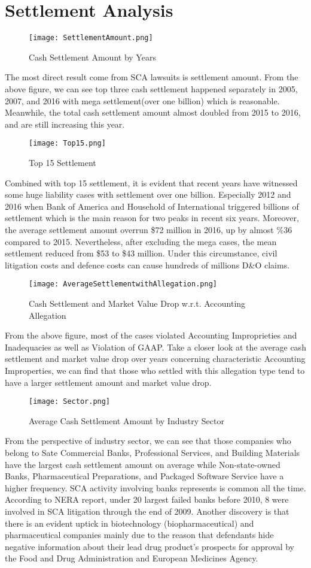 \section{Settlement Analysis}
\begin{figure}[H]
  \centering
  \texttt{[image: SettlementAmount.png]}
  \caption{Cash Settlement Amount by Years}
\end{figure}
The most direct result come from SCA lawsuits is settlement amount. From the above figure, we can see top three cash settlement happened separately in 2005, 2007, and 2016 with mega settlement(over one billion) which is reasonable. Meanwhile, the total cash settlement amount almost doubled from 2015 to 2016, and are still increasing this year. 
\begin{figure}[H]
  \centering
  \texttt{[image: Top15.png]}
  \caption{Top 15 Settlement}
\end{figure}
Combined with top 15 settlement, it is evident that recent years have witnessed some huge liability cases with settlement over one billion. Especially 2012 and 2016 when Bank of America and Household of International triggered billions of settlement which is the main reason for two peaks in recent six years. Moreover, the average settlement amount overrun \$72 million in 2016, up by almost \%36 compared to 2015. Nevertheless, after excluding the mega cases, the mean settlement reduced from \$53 to \$43 million. Under this circumstance, civil litigation costs and defence costs can cause hundreds of millions D\&O claims. 
\begin{figure}[H]
  \centering
  \texttt{[image: AverageSettlementwithAllegation.png]}
  \caption{Cash Settlement and Market Value Drop w.r.t. Accounting Allegation}
\end{figure}
From the above figure, most of the cases violated Accounting Improprieties and Inadequacies as well as Violation of GAAP. Take a closer look at the average cash settlement and market value drop over years concerning characteristic Accounting Improperties, we can find that those who settled with this allegation type tend to have a larger settlement amount and market value drop.\\ 
\begin{figure}[H]
  \centering
  \texttt{[image: Sector.png]}
  \caption{Average Cash Settlement Amount by Industry Sector}
\end{figure}
From the perspective of industry sector, we can see that those companies who belong to Sate Commercial Banks, Professional Services, and Building Materials have the largest cash settlement amount on average while Non-state-owned Banks, Pharmaceutical Preparations, and Packaged Software Service have a higher frequency. SCA activity involving banks represents is common all the time. According to NERA report, under 20 largest failed banks before 2010, 8 were involved in SCA litigation through the end of 2009. Another discovery is that there is an evident uptick in biotechnology (biopharmaceutical) and pharmaceutical companies mainly due to the reason that defendants hide negative information about their lead drug product's prospects for approval by the Food and Drug Administration and European Medicines Agency. \\
